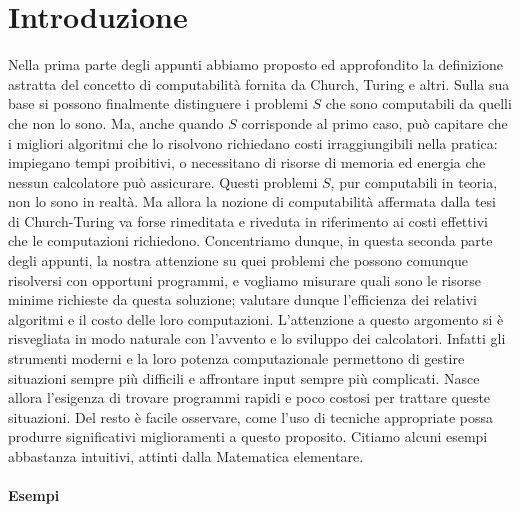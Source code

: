 \section{Introduzione}

Nella prima parte degli appunti abbiamo proposto ed approfondito la definizione
astratta del concetto di computabilità fornita da Church, Turing e altri. Sulla
sua base si possono finalmente distinguere i problemi $S$ che sono computabili
da quelli che non lo sono. Ma, anche quando $S$ corrisponde al primo caso, può
capitare che i migliori algoritmi che lo risolvono richiedano costi
irraggiungibili nella pratica: impiegano tempi proibitivi, o necessitano di
risorse di memoria ed energia che nessun calcolatore può assicurare. Questi
problemi $S$, pur computabili in teoria, non lo sono in realtà. Ma allora la
nozione di computabilità affermata dalla tesi di Church-Turing va forse
rimeditata e riveduta in riferimento ai costi effettivi che le computazioni
richiedono. Concentriamo dunque, in questa seconda parte degli appunti, la nostra
attenzione su quei problemi che possono comunque risolversi con opportuni
programmi, e vogliamo misurare quali sono le risorse minime richieste da questa
soluzione; valutare dunque l'efficienza dei relativi algoritmi e il costo delle
loro computazioni. L'attenzione a questo argomento si è risvegliata in modo
naturale con l'avvento e lo sviluppo dei calcolatori. Infatti gli strumenti
moderni e la loro potenza computazionale permettono di gestire situazioni sempre
più difficili e affrontare input sempre più complicati. Nasce allora l'esigenza
di trovare programmi rapidi e poco costosi per trattare queste situazioni. Del
resto è facile osservare, come l'uso di tecniche appropriate possa produrre
significativi miglioramenti a questo proposito. Citiamo alcuni esempi abbastanza
intuitivi, attinti dalla Matematica elementare.

\paragraph{Esempi}

